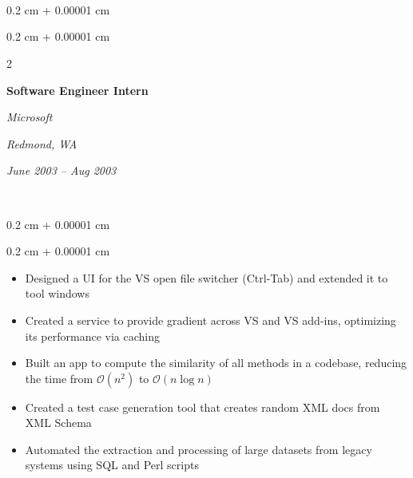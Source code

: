 \documentclass[10pt, letterpaper]{article}
\newenvironment{highlights}{

    \begin{itemize}[

        topsep=0.10 cm,

        parsep=0.10 cm,

        partopsep=0pt,

        itemsep=0pt,

        leftmargin=0.4 cm + 10pt

    ]

}{

    \end{itemize}

} %
\newenvironment{onecolentry}{

    \begin{adjustwidth}{

        0.2 cm + 0.00001 cm

    }{

        0.2 cm + 0.00001 cm

    }

}{

    \end{adjustwidth}

} %
\newenvironment{twocolentry}[2][]{

    \onecolentry

    \def\secondColumn{#2}

    \setcolumnwidth{\fill, 4.5 cm}

    \begin{paracol}{2}

}{

    \switchcolumn \raggedleft \secondColumn

    \end{paracol}

    \endonecolentry

} %
\begin{document}
​

​

        \vspace{0.2 cm}

​

        \begin{twocolentry}{

        \textit{Redmond, WA}    

            

        \textit{June 2003 – Aug 2003}}

            \textbf{Software Engineer Intern}

            

            \textit{Microsoft}

        \end{twocolentry}

​

        \vspace{0.10 cm}

        \begin{onecolentry}

            \begin{highlights}

                \item Designed a UI for the VS open file switcher (Ctrl-Tab) and extended it to tool windows

                \item Created a service to provide gradient across VS and VS add-ins, optimizing its performance via caching

                \item Built an app to compute the similarity of all methods in a codebase, reducing the time from $\mathcal{O}(n^2)$ to $\mathcal{O}(n \log n)$

                \item Created a test case generation tool that creates random XML docs from XML Schema

                \item Automated the extraction and processing of large datasets from legacy systems using SQL and Perl scripts

            \end{highlights}

        \end{onecolentry}

​

​

​
\end{document}
